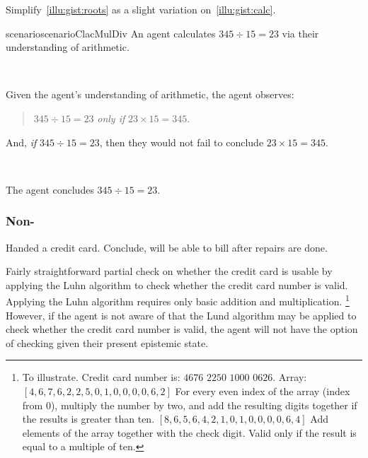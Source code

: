 \begin{note}
  Simplify~\ref{illu:gist:roots} as a slight variation on~\ref{illu:gist:calc}.

  \begin{restatable}{scenario}{scenarioClacMulDiv}
    \label{illu:sketch:math}
    An agent calculates \(345 \div 15 = 23\) via their understanding of arithmetic.

    \mbox{ }

    Given the agent's understanding of arithmetic, the agent observes:
    \begin{quote}
      \(345 \div 15 = 23\) \emph{only if} \(23 \times 15 = 345\).
    \end{quote}
    And, \emph{if} \(345 \div 15 = 23\), then they would not fail to conclude \(23 \times 15 = 345\).

    \mbox{ }

    The agent concludes \(345 \div 15 = 23\).
  \end{restatable}
\end{note}

\subsubsection{Non-}

\begin{note}
  \begin{scenario}
    \label{illu:number-check}
    Handed a credit card.
    Conclude, will be able to bill after repairs are done.
  \end{scenario}

  Fairly straightforward partial check on whether the credit card is usable by applying the Luhn algorithm to check whether the credit card number is valid.
  Applying the Luhn algorithm requires only basic addition and multiplication.%
  \footnote{
    To illustrate.
    Credit card number is:
    \(4676\) \(2250\) \(1000\) \(0626\).
    Array:
    \([4,6,7,6,2,2,5,0,1,0,0,0,0,6,2]\)
    For every even index of the array (index from \(0\)), multiply the number by two, and add the resulting digits together if the results is greater than ten.
    \([8,6,5,6,4,2,1,0,1,0,0,0,0,6,4]\)
    Add elements of the array together with the check digit.
    Valid only if the result is equal to a multiple of ten.
  }
  However, if the agent is not aware of that the Lund algorithm may be applied to check whether the credit card number is valid, the agent will not have the option of checking given their present epistemic state.
\end{note}

